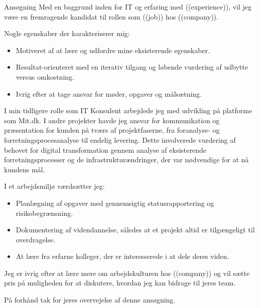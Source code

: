 \documentclass{resume}
\begin{document}

\begin{rSection}{Ansøgning}
    Med en baggrund inden for IT og erfaring med ((experience)), vil jeg være en fremragende kandidat til rollen som ((job)) hos ((company)).

    Nogle egenskaber der karakteriserer mig:

    \begin{itemize}
        \item Motiveret af at lære og udfordre mine eksisterende egenskaber.
        \item Resultat-orienteret med en iterativ tilgang og løbende vurdering af udbytte versus omkostning.
        \item Ivrig efter at tage ansvar for møder, opgaver og målsætning.
    \end{itemize}

    I min tidligere rolle som IT Konsulent arbejdede jeg med udvikling på platforme som Mit.dk. I andre projekter havde jeg ansvar for kommunikation og præsentation for kunden på tværs af projektfaserne, fra foranalyse- og forretningsprocesanalyse til endelig levering. Dette involverede vurdering af behovet for digital transformation gennem analyse af eksisterende forretningsprocesser og de infrastrukturændringer, der var nødvendige for at nå kundens mål.

    I et arbejdsmiljø værdsætter jeg:

    \begin{itemize}
        \item Planlægning af opgaver med gennemsigtig statusrapportering og risikobegrænsning.
        \item Dokumentering af videndannelse, således at et projekt altid er tilgængeligt til overdragelse.
        \item At lære fra erfarne kolleger, der er interesserede i at dele deres viden.
    \end{itemize}

    Jeg er ivrig efter at lære mere om arbejdskulturen hos ((company)) og vil sætte pris på muligheden for at diskutere, hvordan jeg kan bidrage til jeres team.

    På forhånd tak for jeres overvejelse af denne ansøgning.
\end{rSection}
\end{document}

